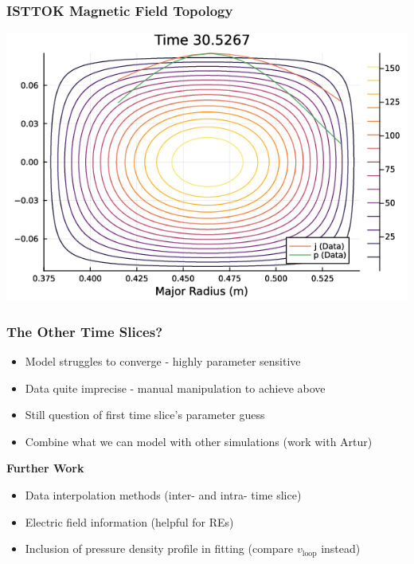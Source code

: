 \documentclass{beamer}
\begin{document}
\begin{frame}
\frametitle{ISTTOK Magnetic Field Topology}

    \includegraphics[scale=0.55]{imgs/mag-field-edited-data-0.png}

\end{frame}



\begin{frame}
\frametitle{The Other Time Slices?}

    \begin{itemize}
        \item Model struggles to converge - highly parameter sensitive
        \item Data quite imprecise - manual manipulation to achieve above
        \item Still question of first time slice's parameter guess 
        \item Combine what we can model with other simulations (work with Artur)
    \end{itemize}
    \textbf{Further Work}
    \begin{itemize}
        \item Data interpolation methods (inter- and intra- time slice)
        \item Electric field information (helpful for REs)
        \item Inclusion of pressure density profile in fitting (compare $v_{\text{loop}}$ instead)
    \end{itemize}
\end{frame}
\end{document}
